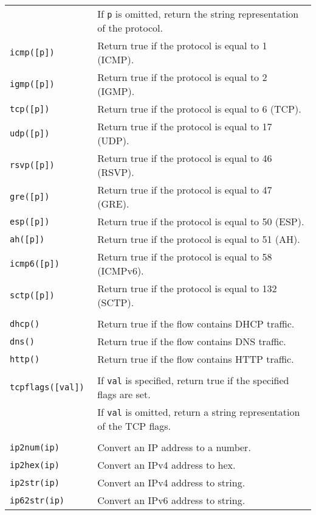 \documentclass[documentation]{subfiles}
\begin{document}
\begin{longtable}{>{\tt}ll}
                                & If {\tt p} is omitted, return the string representation of the protocol.\\
    icmp([p])                   & Return true if the protocol is equal to 1 (ICMP).\\
    igmp([p])                   & Return true if the protocol is equal to 2 (IGMP).\\
    tcp([p])                    & Return true if the protocol is equal to 6 (TCP).\\
    udp([p])                    & Return true if the protocol is equal to 17 (UDP).\\
    rsvp([p])                   & Return true if the protocol is equal to 46 (RSVP).\\
    gre([p])                    & Return true if the protocol is equal to 47 (GRE).\\
    esp([p])                    & Return true if the protocol is equal to 50 (ESP).\\
    ah([p])                     & Return true if the protocol is equal to 51 (AH).\\
    icmp6([p])                  & Return true if the protocol is equal to 58 (ICMPv6).\\
    sctp([p])                   & Return true if the protocol is equal to 132 (SCTP).\\
    \\
    dhcp()                      & Return true if the flow contains DHCP traffic.\\
    dns()                       & Return true if the flow contains DNS traffic.\\
    http()                      & Return true if the flow contains HTTP traffic.\\
    \\
    tcpflags([val])             & If {\tt val} is specified, return true if the specified flags are set.\\
                                & If {\tt val} is omitted, return a string representation of the TCP flags.\\
    \\
    ip2num(ip)                  & Convert an IP address to a number.\\
    ip2hex(ip)                  & Convert an IPv4 address to hex.\\
    ip2str(ip)                  & Convert an IPv4 address to string.\\
    ip62str(ip)                 & Convert an IPv6 address to string.\\

\end{longtable}
\end{document}

